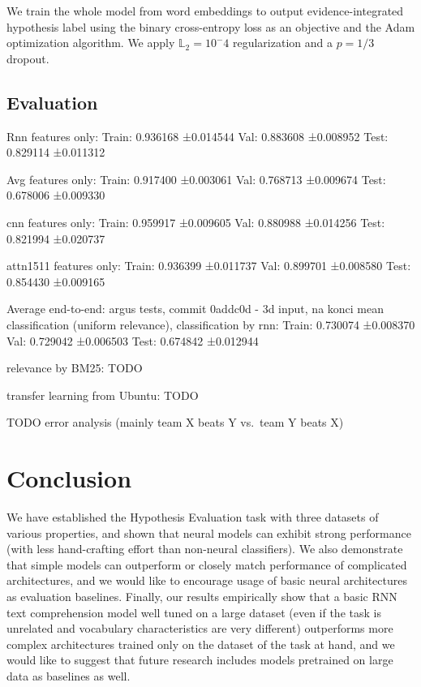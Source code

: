 \documentclass[11pt]{article}
\begin{document}
We train the whole model from word embeddings to output evidence-integrated
hypothesis label using the binary cross-entropy loss as an objective
and the Adam optimization algorithm.  We apply $\mathbb{L}_2 = 10^-4$
regularization and a $p=1/3$ dropout.

\subsection{Evaluation}

Rnn features only:
Train: 0.936168 ±0.014544
Val: 0.883608 ±0.008952
Test: 0.829114 ±0.011312

Avg features only:
Train: 0.917400 ±0.003061
Val: 0.768713 ±0.009674
Test: 0.678006 ±0.009330

cnn features only:
Train: 0.959917 ±0.009605
Val: 0.880988 ±0.014256
Test: 0.821994 ±0.020737

attn1511 features only:
Train: 0.936399 ±0.011737
Val: 0.899701 ±0.008580
Test: 0.854430 ±0.009165

Average end-to-end: argus tests, commit 0addc0d - 3d input, na konci mean
classification (uniform relevance), classification by rnn:
Train: 0.730074 ±0.008370
Val: 0.729042 ±0.006503
Test: 0.674842 ±0.012944

relevance by BM25:
TODO

transfer learning from Ubuntu:
TODO

TODO error analysis (mainly team X beats Y vs.\ team Y beats X)

\section{Conclusion}
\label{sec:concl}

We have established the Hypothesis Evaluation task with three datasets
of various properties, and shown that neural models can exhibit strong
performance (with less hand-crafting effort than non-neural classifiers).
We also demonstrate that simple models can outperform or closely match
performance of complicated architectures, and we would like to encourage
usage of basic neural architectures as evaluation baselines.  Finally,
our results empirically show that a basic RNN text comprehension model
well tuned on a large dataset (even if the task is unrelated and vocabulary
characteristics are very different) outperforms more complex architectures
trained only on the dataset of the task at hand, and we would like to
suggest that future research includes models pretrained on large data as
baselines as well.
\end{document}
